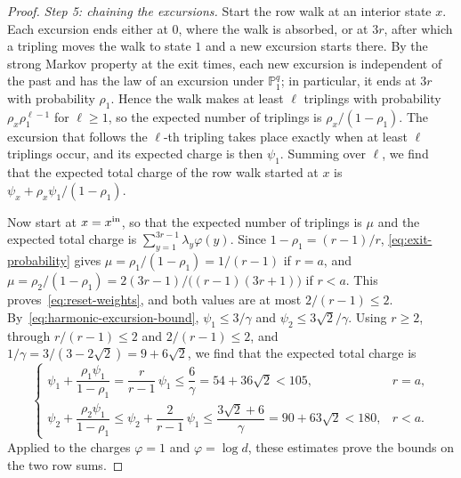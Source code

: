 \begin{proof}
\emph{Step 5: chaining the excursions.} Start the row walk at an interior
state \(x\). Each excursion ends either at \(0\), where the walk is
absorbed, or at \(3r\), after which a tripling moves the walk to state
\(1\) and a new excursion starts there. By the strong Markov property at
the exit times, each new excursion is independent of the past and has the
law of an excursion under \(\mathbb P^q_1\); in particular, it ends at
\(3r\) with probability \(\rho_1\). Hence the walk makes at least \(\ell\)
triplings with probability \(\rho_x\rho_1^{\ell-1}\) for \(\ell\ge1\), so
the expected number of triplings is \(\rho_x/(1-\rho_1)\). The excursion
that follows the \(\ell\)-th tripling takes place exactly when at least
\(\ell\) triplings occur, and its expected charge is then \(\psi_1\).
Summing over \(\ell\), we find that the expected total charge of the row
walk started at \(x\) is \(\psi_x+\rho_x\psi_1/(1-\rho_1)\).

Now start at \(x=x^{\mathrm{in}}\), so that the expected number of triplings is
\(\mu\) and the expected total charge is
\(\sum_{y=1}^{3r-1}\lambda_y\varphi(y)\). Since \(1-\rho_1=(r-1)/r\),
\eqref{eq:exit-probability} gives \(\mu=\rho_1/(1-\rho_1)=1/(r-1)\) if
\(r=a\), and \(\mu=\rho_2/(1-\rho_1)=2(3r-1)/\bigl((r-1)(3r+1)\bigr)\)
if \(r<a\). This proves~\eqref{eq:reset-weights}, and both values are at
most \(2/(r-1)\le2\). By~\eqref{eq:harmonic-excursion-bound},
\(\psi_1\le3/\gamma\) and \(\psi_2\le3\sqrt2/\gamma\). Using \(r\ge2\),
through \(r/(r-1)\le2\) and \(2/(r-1)\le2\), and
\(1/\gamma=3/(3-2\sqrt2)=9+6\sqrt2\), we find that the expected total
charge is
\[
 \begin{cases}
  \psi_1+\dfrac{\rho_1\psi_1}{1-\rho_1}=\dfrac r{r-1}\,\psi_1
  \le\dfrac6\gamma=54+36\sqrt2<105,&r=a,\\[10pt]
  \psi_2+\dfrac{\rho_2\psi_1}{1-\rho_1}\le\psi_2+\dfrac2{r-1}\,\psi_1
  \le\dfrac{3\sqrt2+6}\gamma=90+63\sqrt2<180,&r<a.
 \end{cases}
\]
Applied to the charges \(\varphi=1\) and \(\varphi=\log d\), these
estimates prove the bounds on the two row sums.


\end{proof}
